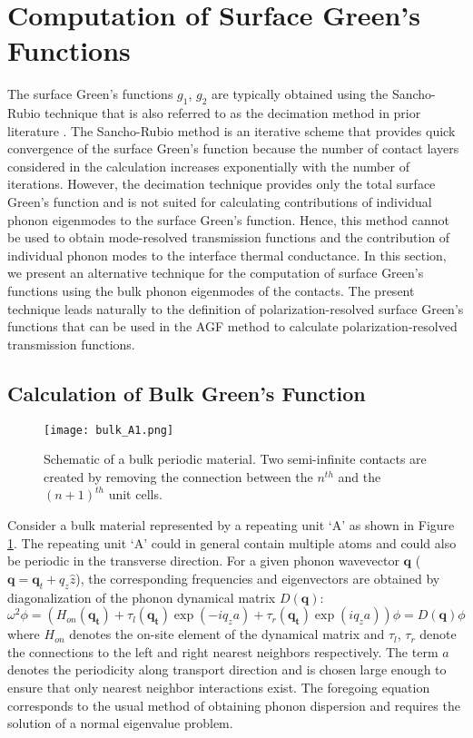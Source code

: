 \documentclass[11pt]{article}
\begin{document}
\section{Computation of Surface Green's Functions}
\label{surf_g}
The surface Green's functions $g_1$, $g_2$ are typically obtained using the Sancho-Rubio technique that is also referred to as the  decimation method in prior literature \cite{guinea1983effective,sancho1985highly}. The Sancho-Rubio method is an iterative scheme that provides quick convergence of the surface Green's function because the number of contact layers considered in the calculation increases exponentially with the number of iterations. However, the decimation technique provides only the total surface Green's function and is not suited for calculating contributions of individual phonon eigenmodes to the surface Green's function. Hence, this method cannot be used to obtain mode-resolved transmission functions and the contribution of individual phonon modes to the interface thermal conductance. In this section, we present an alternative technique for the computation of surface Green's functions using the bulk phonon eigenmodes of the contacts. The present technique leads naturally to the definition of polarization-resolved surface Green's functions that can be used in the AGF method to calculate polarization-resolved transmission functions. 
\subsection{Calculation of Bulk Green's Function}
\begin{figure}
\begin{center}
\texttt{[image: bulk\_A1.png]}
\caption{Schematic of a bulk periodic material. Two semi-infinite contacts are created by removing the connection between the $n^{th}$ and the $(n+1)^{th}$ unit cells.}
\label{bulk_A}
\end{center}
\end{figure}
Consider a bulk material represented by a repeating unit `A' as shown in Figure \ref{bulk_A}. The repeating unit `A' could in general contain multiple atoms and could also be periodic in the transverse direction. For a given phonon wavevector $\boldsymbol{q}$ ($\boldsymbol{q} = \boldsymbol{q}_{t}+q_z \hat{z}$), the corresponding frequencies and eigenvectors are obtained by diagonalization of the phonon dynamical matrix $D(\boldsymbol{q})$:
\begin{equation}
\omega^2\phi = (H_{on}(\boldsymbol{q_{t}})+\tau_l(\boldsymbol{q_{t}})\exp{(-iq_za)}+\tau_r(\boldsymbol{q_{t}})\exp{(iq_za)})\phi = D(\boldsymbol{q})\phi
\label{normal_eig}
\end{equation}
where $H_{on}$ denotes the on-site element of the dynamical matrix and $\tau_l$, $\tau_r$ denote the connections to the left and right nearest neighbors respectively. The term $a$ denotes the periodicity along transport direction and is chosen large enough to ensure that only nearest neighbor interactions exist. The foregoing equation corresponds to the usual method of obtaining phonon dispersion and requires the solution of a normal eigenvalue problem. 
\end{document}

